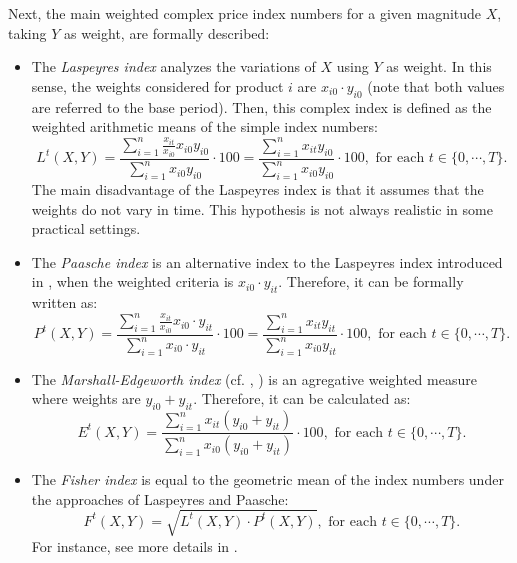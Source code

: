 Next, the main weighted complex price index numbers for a given magnitude $X$, taking $Y$ as weight, are formally described:
\begin{itemize}
	\item The \emph{Laspeyres index} \citep{laspeyres1871ix} analyzes the variations of $X$ using $Y$ as weight. In this sense, the weights considered for product $i$ are $x_{i0}\cdot y_{i0}$ (note that both values are referred to the base period). Then, this complex index is defined as the weighted arithmetic means of the simple index numbers:
	\begin{equation}\label{niLaspeyres}
L^t(X,Y)=\frac{\sum_{i=1}^n \frac{x_{it}}{x_{i0}}x_{i0}y_{i0}}{\sum_{i=1}^n x_{i0}y_{i0}}\cdot 100 = \frac{\sum_{i=1}^n x_{it}y_{i0}}{\sum_{i=1}^n x_{i0}y_{i0}}\cdot 100,\mbox{ for each }t\in\{0,\cdots,T\}.
	\end{equation}	
	The main disadvantage of the Laspeyres index is that it assumes that the weights do not vary in time. This hypothesis is not always realistic in some practical settings.
	\item The \emph{Paasche index} is an alternative index  to the Laspeyres index introduced in \cite{paasche1874ueber}, when the weighted criteria is $x_{i0}\cdot y_{it}$. Therefore, it can be formally written as:
	\begin{equation}\label{niPaasche}
P^t(X,Y)=\frac{ \sum_{i=1}^n\frac{x_{it}}{x_{i0}}x_{i0}\cdot y_{it} }{\sum_{i=1}^n x_{i0}\cdot y_{it}}\cdot100=  \frac{\sum_{i=1}^n  x_{it}y_{it}}{\sum_{i=1}^n x_{i0}y_{it}}\cdot 100,\mbox{ for each }t\in\{0,\cdots,T\}.
	\end{equation}
	\item The \emph{Marshall-Edgeworth index} (cf. \citealp{marshall1887remedies}, \citealp{edgeworth1887measurement}) is an agregative weighted measure where weights are $y_{i0}+y_{it}$. Therefore, it can be calculated as:
	\begin{equation}\label{niEdgeworth}
E^t(X,Y)=\frac{\sum_{i=1}^n x_{it}(y_{i0}+y_{it})}{\sum_{i=1}^n x_{i0}(y_{i0}+y_{it}) }\cdot 100,\mbox{ for each }t\in\{0,\cdots,T\}.
	\end{equation}
	\item The \emph{Fisher index} is equal to the geometric mean of the index numbers under the approaches of Laspeyres and Paasche:
	\begin{equation}\label{niFisher}F^t(X,Y)=\sqrt{L^t(X,Y)\cdot P^t(X,Y)},\mbox{ for each }t\in\{0,\cdots,T\}.\end{equation}
	For instance, see more details in \cite{fisher1922making}.
	
\end{itemize}




